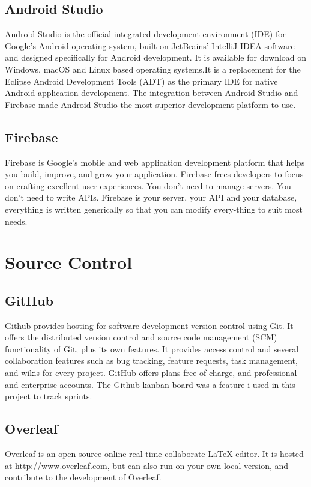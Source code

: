 \subsection{Android Studio}
Android Studio is the official integrated development environment (IDE) for Google's Android operating system, built on JetBrains' IntelliJ IDEA software and designed specifically for Android development. It is available for download on Windows, macOS and Linux based operating systems.It is a replacement for the Eclipse Android Development Tools (ADT) as the primary IDE for native Android application development.\newline
The integration between Android Studio and Firebase made Android Studio the most superior development platform to use.

\subsection{Firebase}
Firebase  is  Google’s  mobile  and  web  application  development  platform  that helps you build,  improve,  and grow your application.  Firebase frees developers to focus on crafting excellent user experiences.  You don’t need to manage servers.  You don’t need to write APIs.  Firebase is your server, your API and your database, everything is written generically so that you can modify every-thing  to  suit  most  needs.   

\section{Source Control}

\subsection{GitHub}
Github provides hosting for software development version control using Git. It offers the distributed version control and source code management (SCM) functionality of Git, plus its own features. It provides access control and several collaboration features such as bug tracking, feature requests, task management, and wikis for every project. GitHub offers plans free of charge, and professional and enterprise accounts. The Github kanban board was a feature i used in this project to track sprints.

\subsection{Overleaf}
Overleaf is an open-source online real-time collaborate LaTeX editor. It is hosted at http://www.overleaf.com, but can also run on your own local version, and contribute to the development of Overleaf.
